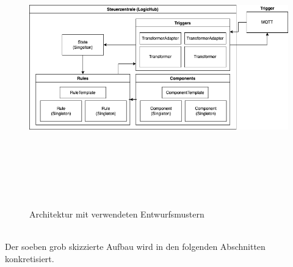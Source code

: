         \begin{figure}[hbt!]
            \centering
            \includegraphics[width=15cm,height=12cm,keepaspectratio]{images/final_architecture_with_patterns.png}
            \caption{Architektur mit verwendeten Entwurfsmustern}
            \label{fig:patternarchitektur}
        \end{figure}
        \\
        Der soeben grob skizzierte Aufbau wird in den folgenden Abschnitten konkretisiert.

